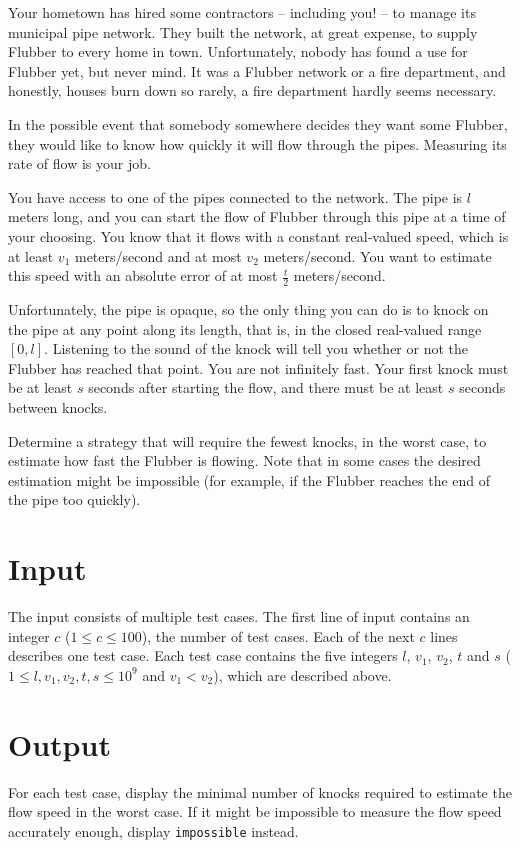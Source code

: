 
%
Your hometown has hired some contractors -- including you! -- to manage its municipal pipe network.
They built the network, at great expense, to supply Flubber to every home in town.
Unfortunately, nobody has found a use for Flubber yet, but never mind.
It was a Flubber network or a fire department, and honestly, houses burn down so rarely, a fire department hardly seems necessary.

In the possible event that somebody somewhere decides they want some Flubber, they would like to know how quickly it will flow through the pipes.
Measuring its rate of flow is your job.

You have access to one of the pipes connected to the network.
The pipe is $l$ meters long, and you can start the flow of Flubber through this pipe at a time of your choosing.
You know that it flows with a constant real-valued speed, which is at least $v_1$ meters/second and at most $v_2$ meters/second.
You want to estimate this speed with an absolute error of at most $\frac{t}{2}$ meters/second.

Unfortunately, the pipe is opaque, so the only thing you can do is to knock on the pipe at any point along its length, that is, in the closed real-valued range $[0,l]$.
Listening to the sound of the knock will tell you whether or not the Flubber has reached that point.
You are not infinitely fast.  Your first knock must be at least $s$ seconds after starting the flow, and there must be at least $s$ seconds between knocks.

Determine a strategy that will require the fewest knocks, in the worst case, to estimate how fast the Flubber is flowing.
Note that in some cases the desired estimation might be impossible (for example, if the Flubber reaches the end of the pipe too quickly).

\section*{Input}

The input consists of multiple test cases. The first line of input contains an integer  $c$ ($1 \leq c \leq 100$), the number of test cases.
Each of the next $c$ lines describes one test case.
Each test case contains the five integers $l$, $v_1$, $v_2$, $t$ and $s$ ($1 \leq l, v_1, v_2, t, s \leq 10^9$ and $v_1 < v_2$), which are described above.

\section*{Output}

For each test case, display the minimal number of knocks required to estimate the flow speed in the worst case.
If it might be impossible to measure the flow speed accurately enough, display \texttt{impossible} instead.

